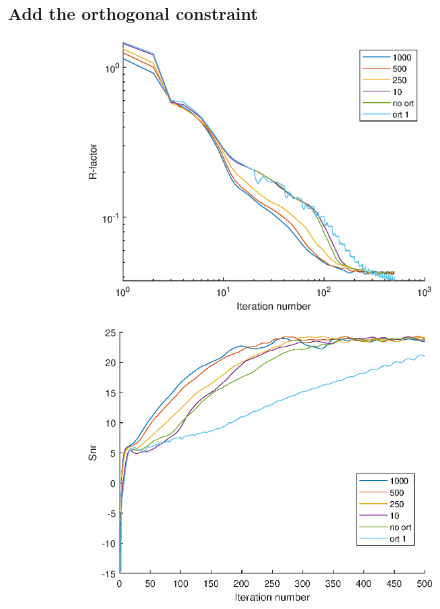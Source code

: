 \documentclass[UTF8]{beamer}
\begin{document}
\begin{frame} \frametitle{Add the orthogonal constraint}
	\begin{figure}
		\begin{subfigure}{.33\textwidth}
			\centering
			\includegraphics[width=1\linewidth]{../figures/ort_R.eps}  
			\label{fig:ort_R}
		\end{subfigure}
		\begin{subfigure}{.3\textwidth}
			\centering
			\includegraphics[width=1\linewidth]{../figures/ort_snr.eps}  

\end{subfigure}
\end{figure}
\end{frame}
\end{document}
